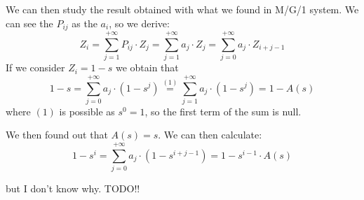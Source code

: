 We can then study the result obtained with what we found in M/G/1 system. We can see the $P_{i j}$ as the $a_i$, so we derive:
\begin{equation}
	Z_i = \sum\limits_{j=1}^{+\infty} P_{i j} \cdot Z_j = \sum\limits_{j=1}^{+\infty} a_{j} \cdot Z_j=\sum\limits_{j=0}^{+\infty} a_{j} \cdot Z_{i+j-1}
\end{equation}
If we consider $Z_i = 1-s$ we obtain that
\begin{equation}
	1-s = \sum\limits_{j=0}^{+\infty} a_{j} \cdot (1-s^j) \stackrel{(1)}{=}\sum\limits_{j=1}^{+\infty} a_{j} \cdot (1-s^j) = 1-A(s)
\end{equation}
where $(1)$ is possible as $s^0=1$, so the first term of the sum is null.

We then found out that $A(s)=s$. We can then calculate:
\begin{equation}
	1-s^i = \sum\limits_{j=0}^{+\infty} a_{j} \cdot (1-s^{i+j-1}) = 1-s^{i-1} \cdot A(s)
\end{equation}

but I don't know why. TODO!!

